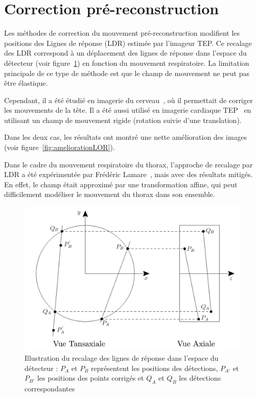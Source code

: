 \section{Correction pré-reconstruction}

Les méthodes de correction du mouvement pré-reconstruction modifient les positions des Lignes de réponse (LDR) estimée par l'imageur TEP.
Ce recalage des LDR correspond à un déplacement des lignes de réponse dans l'espace du détecteur (voir figure~\ref{fig:recalageLOR}) en fonction du mouvement respiratoire. La limitation principale de ce type de méthode est que le champ de mouvement ne peut pas être élastique.

Cependant, il a été étudié en imagerie du cerveau~\cite{bloomfield2003design}, où il permettait de corriger les mouvements de la tête. Il a été aussi utilisé en imagerie cardiaque TEP~\cite{livieratos2005rigid} en utilisant un champ de mouvement rigide (rotation suivie d'une translation).

Dans les deux cas, les résultats ont montré une nette amélioration des images (voir figure~\ref{fig:ameliorationLOR}).

Dans le cadre du mouvement respiratoire du thorax, l'approche de recalage par LDR a été expérimentée par Frédéric Lamare~\cite{lamare2007respiratory}, mais avec des résultats mitigés. En effet, le champ était approximé par une transformation affine, qui peut difficilement modéliser le mouvement du thorax dans son ensemble.

\begin{figure}[h!]
	\begin{center}
		\includegraphics[width=12cm]{images/recalageLOR}
	\end{center}
	\caption{Illustration du recalage des lignes de réponse dans l'espace du détecteur : $P_A$ et $P_B$ représentent les positions des détections, $P_{A'}$ et $P_{B'}$ les positions des points corrigés et $Q_A$ et $Q_B$ les détections correspondantes } 
	\label{fig:recalageLOR}
\end{figure}

